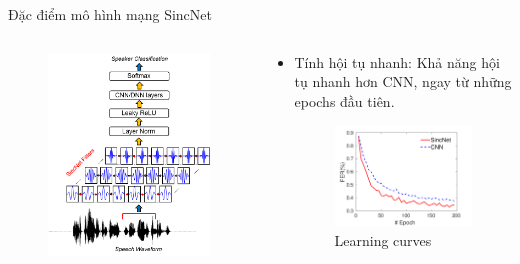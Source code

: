 \documentclass[11pt]{beamer}
\begin{document}
\begin{frame}{Đặc điểm mô hình mạng SincNet}
	\begin{columns}
		\begin{column}{0.47\textwidth}
			\begin{figure}[H]
				\includegraphics[width=0.9\linewidth]{images/SincNet.png}
			\end{figure}
		\end{column}
		\begin{column}{0.5\textwidth}
		\begin{itemize}
			\item Tính hội tụ nhanh: Khả năng hội tụ nhanh hơn CNN, ngay từ những epochs đầu tiên.
			\begin{figure}[H]
				\includegraphics[width=0.9\linewidth]{images/fast_convergence.png}
				\caption{Learning curves}
			\end{figure}
		\end{itemize}
		\end{column}
	\end{columns}
\end{frame}
\end{document}
